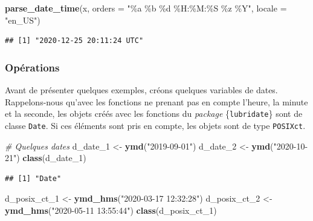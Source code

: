 \documentclass[
  11pt,
]{book}
\newenvironment{Shaded}{\begin{snugshade}}{\end{snugshade}}
\newcommand{\CommentTok}[1]{\textcolor[rgb]{0.56,0.35,0.01}{\textit{#1}}}
\newcommand{\DataTypeTok}[1]{\textcolor[rgb]{0.13,0.29,0.53}{#1}}
\newcommand{\DecValTok}[1]{\textcolor[rgb]{0.00,0.00,0.81}{#1}}
\newcommand{\KeywordTok}[1]{\textcolor[rgb]{0.13,0.29,0.53}{\textbf{#1}}}
\newcommand{\NormalTok}[1]{#1}
\newcommand{\StringTok}[1]{\textcolor[rgb]{0.31,0.60,0.02}{#1}}
\numberwithin{equation}{section}
\numberwithin{countremarque}{section}
\begin{document}
\begin{Shaded}
\begin{Highlighting}[]
\KeywordTok{parse\_date\_time}\NormalTok{(x, }\DataTypeTok{orders =} \StringTok{"\%a \%b \%d \%H:\%M:\%S \%z \%Y"}\NormalTok{, }\DataTypeTok{locale =} \StringTok{"en\_US"}\NormalTok{)}
\end{Highlighting}
\end{Shaded}

\begin{lstlisting}
## [1] "2020-12-25 20:11:24 UTC"
\end{lstlisting}

\hypertarget{opuxe9rations}{%
\subsubsection{Opérations}\label{opuxe9rations}}

Avant de présenter quelques exemples, créons quelques variables de dates. Rappelons-nous qu'avec les fonctions ne prenant pas en compte l'heure, la minute et la seconde, les objets créés avec les fonctions du \emph{package} \{\texttt{lubridate}\} sont de classe \texttt{Date}. Si ces éléments sont pris en compte, les objets sont de type \texttt{POSIXct}.

\begin{Shaded}
\begin{Highlighting}[]
\CommentTok{\# Quelques dates}
\NormalTok{d\_date\_}\DecValTok{1}\NormalTok{ \textless{}{-}}\StringTok{ }\KeywordTok{ymd}\NormalTok{(}\StringTok{"2019{-}09{-}01"}\NormalTok{)}
\NormalTok{d\_date\_}\DecValTok{2}\NormalTok{ \textless{}{-}}\StringTok{ }\KeywordTok{ymd}\NormalTok{(}\StringTok{"2020{-}10{-}21"}\NormalTok{)}
\KeywordTok{class}\NormalTok{(d\_date\_}\DecValTok{1}\NormalTok{)}
\end{Highlighting}
\end{Shaded}

\begin{lstlisting}
## [1] "Date"
\end{lstlisting}

\begin{Shaded}
\begin{Highlighting}[]
\NormalTok{d\_posix\_ct\_}\DecValTok{1}\NormalTok{ \textless{}{-}}\StringTok{ }\KeywordTok{ymd\_hms}\NormalTok{(}\StringTok{"2020{-}03{-}17 12:32:28"}\NormalTok{)}
\NormalTok{d\_posix\_ct\_}\DecValTok{2}\NormalTok{ \textless{}{-}}\StringTok{ }\KeywordTok{ymd\_hms}\NormalTok{(}\StringTok{"2020{-}05{-}11 13:55:44"}\NormalTok{)}
\KeywordTok{class}\NormalTok{(d\_posix\_ct\_}\DecValTok{1}\NormalTok{)}
\end{Highlighting}
\end{Shaded}
\end{document}
